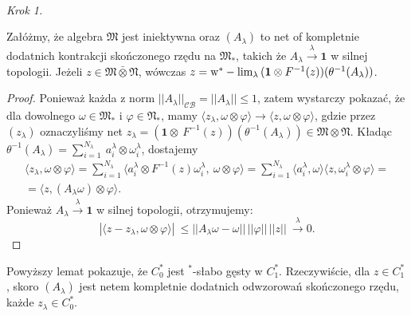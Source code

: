 \paragraph{}
{\it Krok 1.}
\begin{Lemma}
\label{lem:netinvNalg}
Załóżmy, że algebra $\mathfrak{M}$ jest iniektywna oraz
$(A_{\lambda})$ to net of kompletnie dodatnich kontrakcji skończonego rzędu na
$\mathfrak{M}_{*}$, takich że
$A_{\lambda} \stackrel{\lambda}{\rightarrow} \mathbf{1}$ w silnej topologii.
Jeżeli $z \in \mathfrak{M} \bar{\otimes} \mathfrak{N}$, wówczas
$z = {\rm w}^*-\lim_{\lambda} \, (\mathbf{1} \otimes F^{-1}(z) )
(\theta^{-1} (A_{\lambda}))$.
\end{Lemma}
\begin{proof}
Ponieważ każda z norm $||A_{\lambda}||_{\mathcal{CB}} = || A_{\lambda} ||  \leq 1$,
zatem wystarczy pokazać, że dla dowolnego $\omega \in \mathfrak{M}_{*}$
i $\varphi \in \mathfrak{N}_{*}$,
mamy
$\langle z_{\lambda}, \omega \otimes \varphi\rangle{\longrightarrow}
\langle z , \omega \otimes \varphi\rangle$,
gdzie przez $(z_{\lambda})$ oznaczyliśmy net $z_{\lambda} = (\mathbf{1} \otimes \
F^{-1}(z))(\theta^{-1}(A_{\lambda})) \in \mathfrak{M} \otimes \mathfrak{N}$.
Kładąc
$\theta^{-1}(A_{\lambda}) = \sum_{i=1}^{N_{\lambda}} \
a_{i}^{\lambda} \otimes \omega_{i}^{\lambda}$, dostajemy
\begin{multline}
\langle z_{\lambda}, \omega \otimes \varphi\rangle =
\sum \limits_{i=1}^{N_{\lambda}}
\langle a_{i}^{\lambda} \otimes F^{-1}(z) \omega_{i}^{\lambda} ,\
\omega \otimes \varphi \rangle 
= \sum \limits_{i=1}^{N_{\lambda}}
\langle  a_{i}^{\lambda}, \omega \rangle
\langle z,  \omega_{i}^{\lambda} \otimes \varphi \rangle = \\
= \langle z , (A_{\lambda} \omega) \otimes \varphi \rangle.
\end{multline}
Ponieważ $A_{\lambda} \stackrel{\lambda}{\rightarrow} \mathbf{1}$ w silnej topologii,
otrzymujemy:
\begin{equation}
| \langle z - z_{\lambda}, \omega\otimes \varphi \rangle | \
\leq || A_{\lambda} \omega - \omega || \, ||\varphi|| \, ||z|| \
\stackrel{\lambda}{\longrightarrow} 0.
\end{equation}
\end{proof}

\begin{Corollary}
\label{cor:denseness}
Powyższy lemat pokazuje, że $C_0^*$ jest $^{*}$-słabo gęsty w $C_1^*$.
Rzeczywiście, dla
$z \in C_{1}^{*}$, skoro $(A_{\lambda})$ jest netem kompletnie dodatnich
odwzorowań skończonego rzędu, każde $z_{\lambda} \in C_{0}^{*}$.
\end{Corollary}
 
